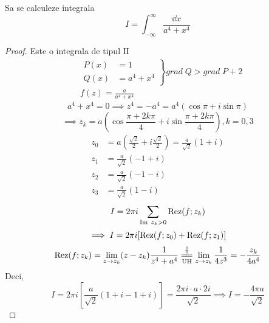 
\begin{aplicatie}[1]
    Sa se calculeze integrala
    \[
    I = \int_{-\infty}^{\infty} \frac{\dd x}{a^4+x^4}
    \]
    \begin{proof}

    Este o integrala de tipul $\mathrm{II}$
    \begin{align*}
        &\left .
            \begin{aligned}
                P(x) &= 1 \\
                Q(x) &= a^4 +x^4
            \end{aligned}
        \right \}
        grad\; Q > grad\; P+2 \\
        & f(z) = \frac{a}{a^4 +x^4}
    \end{align*}
    \[
        a^4 +x^4 = 0 \implies z^4 = -a^4 = a^4 (\cos \pi + i\sin \pi)
    \]
    \[
        \implies z_k = a \left( \cos \frac{\pi+2k\pi}{4} + i \sin \frac{\pi+2k\pi}{4} \right)
            , k=\overline{0,3}
    \]
    \begin{align*}
        z_0 &= a \left(\frac{\sqrt 2}{2} + i\frac{\sqrt 2}{2} \right)
            = \frac{a}{\sqrt 2} (1+i) \\
        z_1 &= \frac{a}{\sqrt 2} (-1+i) \\
        z_2 &= \frac{a}{\sqrt 2} (-1-i) \\
        z_3 &= \frac{a}{\sqrt 2} (1-i)
    \end{align*}
    \[
        I = 2 \pi i \sum_{\operatorname{Im}  \; z_k >0} \operatorname{Rez}(f;z_k)
    \]
    \[
        \implies I = 2 \pi i [\operatorname{Rez}(f;z_0) + \operatorname{Rez}(f;z_1)]
    \]
    \[
        \Rez(f;z_k) = \lim_{z \to z_k} (z-z_k) \frac{1}{z^4+a^4}
            \EqConformCaz
            \lim_{z \to z_k} \frac{1}{4z^3}
            = - \frac{z_k}{4a^4}
    \]
    Deci,
    \[
        I = 2 \pi i \left[ \frac{a}{\sqrt 2} (1+i -1 +i) \right]
            = \frac{2 \pi i \cdot a \cdot 2i}{\sqrt 2}
            \implies I = - \frac{4 \pi a}{\sqrt 2}
    \]
    \end{proof}
\end{aplicatie}

